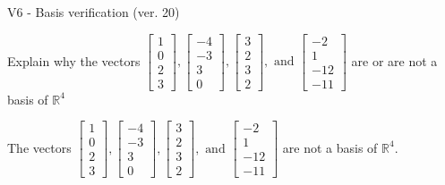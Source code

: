 \begin{exercise}
  \begin{exerciseTitle}V6 - Basis verification (ver. 20)\end{exerciseTitle}
  \begin{exerciseStatement}
    Explain why the vectors \(\left[\begin{array}{r}
1 \\
0 \\
2 \\
3
\end{array}\right] , \left[\begin{array}{r}
-4 \\
-3 \\
3 \\
0
\end{array}\right] , \left[\begin{array}{r}
3 \\
2 \\
3 \\
2
\end{array}\right] , \text{ and } \left[\begin{array}{r}
-2 \\
1 \\
-12 \\
-11
\end{array}\right]\) are or are not a basis of \(\mathbb{R}^4\)	


  \end{exerciseStatement}
  \begin{exerciseAnswer}
   The vectors \(\left[\begin{array}{r}
1 \\
0 \\
2 \\
3
\end{array}\right] , \left[\begin{array}{r}
-4 \\
-3 \\
3 \\
0
\end{array}\right] , \left[\begin{array}{r}
3 \\
2 \\
3 \\
2
\end{array}\right] , \text{ and } \left[\begin{array}{r}
-2 \\
1 \\
-12 \\
-11
\end{array}\right]\) 
  	 are not  a basis of \(\mathbb{R}^4\).
  


  \end{exerciseAnswer}
\end{exercise}